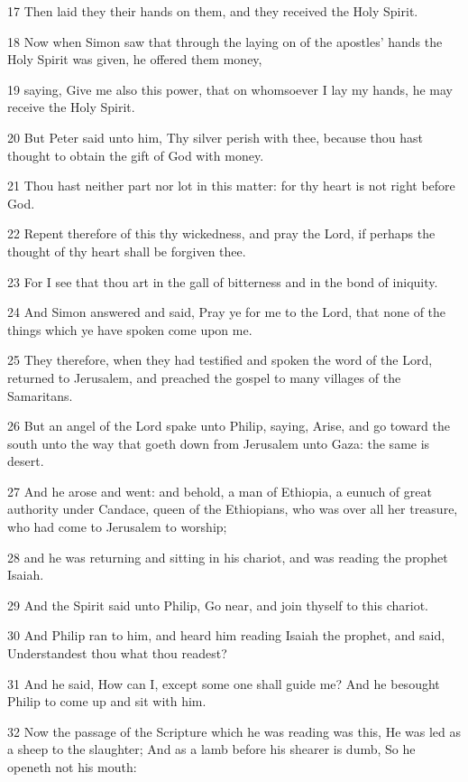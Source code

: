 \par 17 Then laid they their hands on them, and they received the Holy Spirit.
\par 18 Now when Simon saw that through the laying on of the apostles' hands the Holy Spirit was given, he offered them money,
\par 19 saying, Give me also this power, that on whomsoever I lay my hands, he may receive the Holy Spirit.
\par 20 But Peter said unto him, Thy silver perish with thee, because thou hast thought to obtain the gift of God with money.
\par 21 Thou hast neither part nor lot in this matter: for thy heart is not right before God.
\par 22 Repent therefore of this thy wickedness, and pray the Lord, if perhaps the thought of thy heart shall be forgiven thee.
\par 23 For I see that thou art in the gall of bitterness and in the bond of iniquity.
\par 24 And Simon answered and said, Pray ye for me to the Lord, that none of the things which ye have spoken come upon me.
\par 25 They therefore, when they had testified and spoken the word of the Lord, returned to Jerusalem, and preached the gospel to many villages of the Samaritans.
\par 26 But an angel of the Lord spake unto Philip, saying, Arise, and go toward the south unto the way that goeth down from Jerusalem unto Gaza: the same is desert.
\par 27 And he arose and went: and behold, a man of Ethiopia, a eunuch of great authority under Candace, queen of the Ethiopians, who was over all her treasure, who had come to Jerusalem to worship;
\par 28 and he was returning and sitting in his chariot, and was reading the prophet Isaiah.
\par 29 And the Spirit said unto Philip, Go near, and join thyself to this chariot.
\par 30 And Philip ran to him, and heard him reading Isaiah the prophet, and said, Understandest thou what thou readest?
\par 31 And he said, How can I, except some one shall guide me? And he besought Philip to come up and sit with him.
\par 32 Now the passage of the Scripture which he was reading was this, He was led as a sheep to the slaughter; And as a lamb before his shearer is dumb, So he openeth not his mouth:
